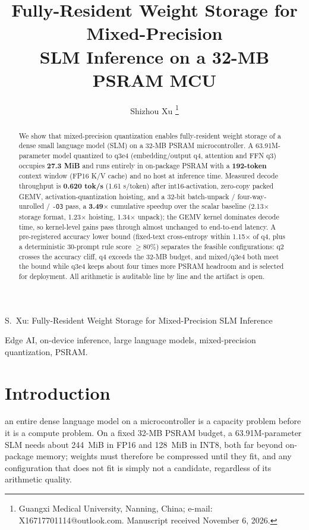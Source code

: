 \documentclass[journal,letterpaper]{IEEEtran}
\begin{document}
\title{Fully-Resident Weight Storage for Mixed-Precision\\ SLM Inference on a 32-MB PSRAM MCU}

\author{Shizhou Xu%
\thanks{Guangxi Medical University, Nanning, China; e-mail: X16717701114@outlook.com.
Manuscript received November 6, 2026.}}

%
{S.~Xu: Fully-Resident Weight Storage for Mixed-Precision SLM Inference}

\maketitle

\begin{abstract}
We show that mixed-precision quantization enables fully-resident weight storage of a dense
small language model (SLM) on a 32-MB PSRAM microcontroller. A 63.91M-parameter model
quantized to q3e4 (embedding/output q4, attention and FFN q3) occupies \textbf{27.3 MiB}
and runs entirely in on-package PSRAM with a \textbf{192-token} context window (FP16 K/V cache) and no host
at inference time. Measured decode throughput is \textbf{0.620 tok/s} (1.61 s/token) after int16-activation,
zero-copy packed GEMV, activation-quantization hoisting, and a 32-bit batch-unpack /
four-way-unrolled / \texttt{-O3} pass, a \textbf{3.49$\times$} cumulative speedup over the
scalar baseline (2.13$\times$ storage format, 1.23$\times$ hoisting, 1.34$\times$ unpack); the GEMV kernel dominates
decode time, so kernel-level gains pass through almost unchanged to end-to-end latency. A pre-registered
accuracy lower bound (fixed-text cross-entropy within 1.15$\times$ of q4, plus a deterministic
30-prompt rule score $\geq 80\%$) separates the feasible configurations: q2 crosses the
accuracy cliff, q4 exceeds the 32-MB budget, and mixed/q3e4 both meet the bound while q3e4
keeps about four times more PSRAM headroom and is selected for deployment. All arithmetic is
auditable line by line and the artifact is open.
\end{abstract}

\begin{IEEEkeywords}
Edge AI, on-device inference, large language models, mixed-precision quantization, PSRAM.
\end{IEEEkeywords}

\section{Introduction}
 an entire dense language model on a microcontroller is a capacity
problem before it is a compute problem. On a fixed 32-MB PSRAM budget, a 63.91M-parameter
SLM needs about 244~MiB in FP16 and 128~MiB in INT8, both far beyond on-package memory;
weights must therefore be compressed until they fit, and any configuration that does not fit
is simply not a candidate, regardless of its arithmetic quality.
\end{document}

